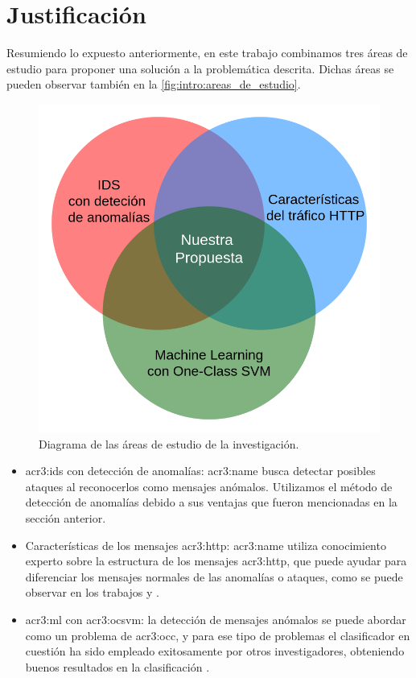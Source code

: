 \section{Justificación}

Resumiendo lo expuesto anteriormente, en este trabajo combinamos tres
áreas de estudio para proponer una solución a la problemática descrita.
Dichas áreas se pueden observar también en la \autoref{fig:intro:areas_de_estudio}.

\begin{figure}[ht]
    \centering
    \includegraphics[width=0.5\linewidth]{images/venn-areas-de-estudio.png}

    \caption{Diagrama de las áreas de estudio de la investigación.}
    \label{fig:intro:areas_de_estudio}
\end{figure}

\begin{itemize}
    \item
    \gls{acr3:ids} con detección de anomalías:
    \gls{acr3:name} busca detectar posibles ataques al reconocerlos como
    mensajes anómalos. Utilizamos el método de detección de anomalías
    debido a sus ventajas que fueron mencionadas en la sección anterior.

    \item
    Características de los mensajes \gls{acr3:http}:
    \gls{acr3:name} utiliza conocimiento experto sobre la estructura de
    los mensajes \gls{acr3:http}, que puede ayudar para diferenciar los
    mensajes normales de las anomalías o ataques, como se puede observar
    en los trabajos  \citep{kruegel2003anomaly} y \citep{kruegel2005multi}.

    \item
    \gls{acr3:ml} con \gls{acr3:ocsvm}:
    la detección de mensajes anómalos se puede abordar como un problema
    de \gls{acr3:occ}, y para ese tipo de problemas el clasificador en
    cuestión ha sido empleado exitosamente por otros investigadores,
    obteniendo buenos resultados en la clasificación
    \citep{khan2014one}. %
\end{itemize}

